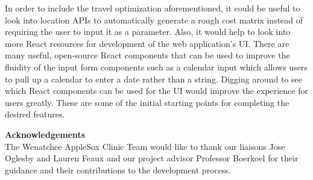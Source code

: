 \documentclass[book]{hmcclinic}
\begin{document}
In order to include the travel optimization aforementioned, it could be useful to look into location APIs to automatically generate a rough cost matrix instead of requiring the user to input it as a parameter. Also, it would help to look into more React resources for development of the web application's UI. There are many useful, open-source React components that can be used to improve the fluidity of the input form components such as a calendar input which allows users to pull up a calendar to enter a date rather than a string. Digging around to see which React components can be used for the UI would improve the experience for users greatly. These are some of the initial starting points for completing the desired features. 

\newpage
\textbf{Acknowledgements} \\
The Wenatchee AppleSox Clinic Team would like to thank our liaisons Jose Oglesby and Lauren Feaux and our project advisor Professor Boerkoel for their guidance and their contributions to the development process.








\end{document}
